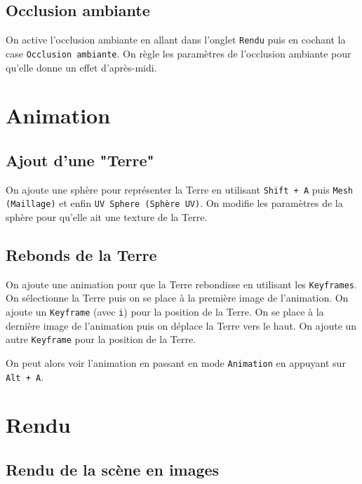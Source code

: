 \documentclass[french,a4paper,10pt]{article}
\begin{document}
    \subsection{Occlusion ambiante}\label{subsec:4.2}

    On active l'occlusion ambiante en allant dans l'onglet \texttt{Rendu} puis en cochant la case \texttt{Occlusion
    ambiante}.
    On règle les paramètres de l'occlusion ambiante pour qu'elle donne un effet d'après-midi.

    \section{Animation}\label{sec:5}

    \subsection{Ajout d'une "Terre"}\label{subsec:5.1}

    On ajoute une sphère pour représenter la Terre en utilisant \texttt{Shift + A} puis \texttt{Mesh (Maillage)} et enfin
    \texttt{UV Sphere (Sphère UV)}.
    On modifie les paramètres de la sphère pour qu'elle ait une texture de la Terre.

    \subsection{Rebonds de la Terre}\label{subsec:5.2}

    On ajoute une animation pour que la Terre rebondisse en utilisant les \texttt{Keyframes}.
    On sélectionne la Terre puis on se place à la première image de l'animation.
    On ajoute un \texttt{Keyframe} (avec \texttt{i}) pour la position de la Terre.
    On se place à la dernière image de l'animation puis on déplace la Terre vers le haut.
    On ajoute un autre \texttt{Keyframe} pour la position de la Terre.

    On peut alors voir l'animation en passant en mode \texttt{Animation} en appuyant sur \texttt{Alt + A}.

    \section{Rendu}\label{sec:6}

    \subsection{Rendu de la scène en images}\label{subsec:6.1}
\end{document}
